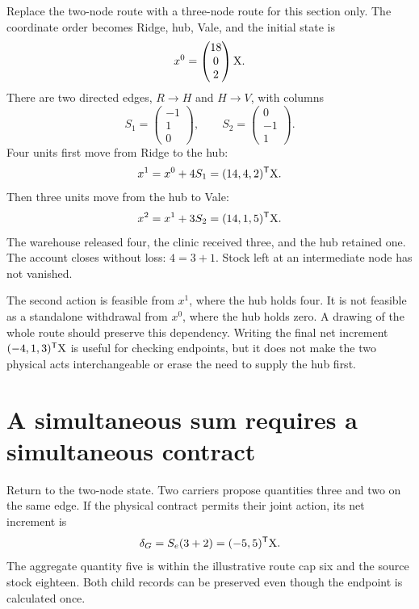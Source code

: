 Replace the two-node route with a three-node route for this section only. The coordinate order becomes Ridge, hub, Vale, and the initial state is
\begin{equation}
x^0=\begin{pmatrix}18\\0\\2\end{pmatrix}\mathrm{X}.
\end{equation}
There are two directed edges, \(R\to H\) and \(H\to V\), with columns
\begin{equation}
S_1=\begin{pmatrix}-1\\1\\0\end{pmatrix},
\qquad
S_2=\begin{pmatrix}0\\-1\\1\end{pmatrix}.
\end{equation}
Four units first move from Ridge to the hub:
\begin{equation}
x^1=x^0+4S_1=(14,4,2)^{\mathsf T}\mathrm{X}.
\end{equation}
Then three units move from the hub to Vale:
\begin{equation}
x^2=x^1+3S_2=(14,1,5)^{\mathsf T}\mathrm{X}.
\end{equation}
The warehouse released four, the clinic received three, and the hub retained one. The account closes without loss: \(4=3+1\). Stock left at an intermediate node has not vanished.

The second action is feasible from \(x^1\), where the hub holds four. It is not feasible as a standalone withdrawal from \(x^0\), where the hub holds zero. A drawing of the whole route should preserve this dependency. Writing the final net increment \((-4,1,3)^{\mathsf T}\mathrm{X}\) is useful for checking endpoints, but it does not make the two physical acts interchangeable or erase the need to supply the hub first.

\section{A simultaneous sum requires a simultaneous contract}

Return to the two-node state. Two carriers propose quantities three and two on the same edge. If the physical contract permits their joint action, its net increment is
\begin{equation}
\delta_G=S_e(3+2)=(-5,5)^{\mathsf T}\mathrm{X}.
\end{equation}
The aggregate quantity five is within the illustrative route cap six and the source stock eighteen. Both child records can be preserved even though the endpoint is calculated once.


